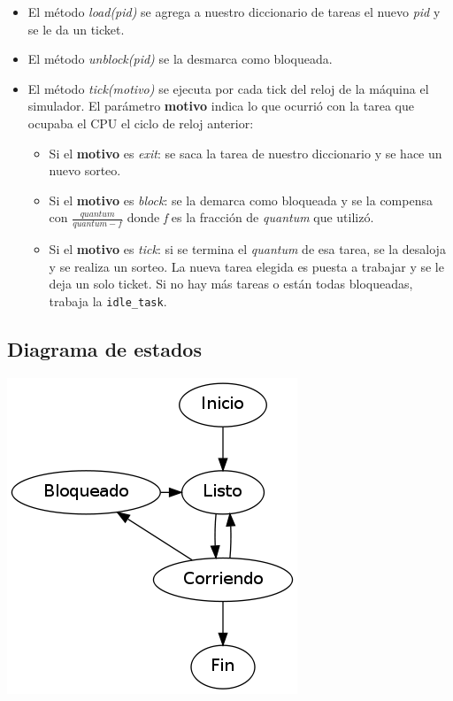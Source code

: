 \begin{itemize}
	\item El método \textit{load(pid)} se agrega a nuestro diccionario de tareas el nuevo \textit{pid} y se le da un ticket.
	\item El método \textit{unblock(pid)} se la desmarca como bloqueada.
	\item El método \textit{tick(motivo)} se ejecuta por cada tick del reloj de la máquina el simulador. El parámetro \textbf{motivo} indica lo que ocurrió con la tarea que ocupaba el CPU el ciclo de reloj anterior:
	
	\begin{itemize}
		\item Si el \textbf{motivo} es \textit{exit}: se saca la tarea de nuestro diccionario y se hace un nuevo sorteo.
		\item Si el \textbf{motivo} es \textit{block}: se la demarca como bloqueada y se la compensa con $\frac{quantum}{quantum - f}$ donde \textit{f} es la fracci\'on de \textit{quantum} que utiliz\'o.
		\item Si el \textbf{motivo} es \textit{tick}: si se termina el \textit{quantum} de esa tarea, se la desaloja y se realiza un sorteo. La nueva tarea elegida es puesta a trabajar y se le deja un solo ticket. Si no hay m\'as tareas o est\'an todas bloqueadas, trabaja la \verb|idle_task|.
	\end{itemize}
\end{itemize}

\subsection{Diagrama de estados}
\begin{center}
\includegraphics[scale=0.5]{estados.png}
\end{center}

